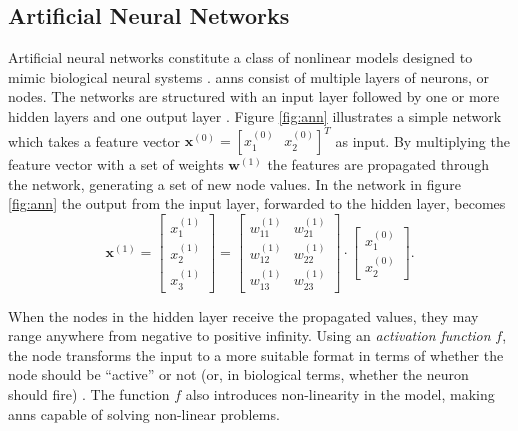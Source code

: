 

\subsection{Artificial Neural Networks}
Artificial neural networks constitute a class of nonlinear models designed to mimic biological neural systems \citep{rojas_1996}. \gls{ann}s consist of multiple layers of neurons, or nodes. The networks are structured with an input layer followed by one or more hidden layers and one output layer \citep{logan_2017}. Figure \ref{fig:ann} illustrates a simple network which takes a feature vector $\mathbf{x}^{(0)}=[x_1^{(0)}\text{ }  x_2^{(0)}]^{T}$ as input. By multiplying the feature vector with a set of weights $\mathbf{w}^{(1)}$ the features are propagated through the network, generating a set of new node values. In the network in figure \ref{fig:ann} the output from the input layer, forwarded to the hidden layer, becomes
\begin{equation}\label{eq:nn}
	\mathbf{x}^{(1)}=\begin{bmatrix}x_1^{(1)} \\ x_2^{(1)} \\ x_3^{(1)} \end{bmatrix} = 
	\begin{bmatrix} w_{11}^{(1)} & w_{21}^{(1)} \\ w_{12}^{(1)} & w_{22}^{(1)} \\ w_{13}^{(1)} & w_{23}^{(1)}\end{bmatrix}\cdot \begin{bmatrix}x_1^{(0)} \\ x_2^{(0)}\end{bmatrix}.
\end{equation}

When the nodes in the hidden layer receive the propagated values, they may range anywhere from negative to positive infinity. Using an \textit{activation function} $f$, the node transforms the input to a more suitable format in terms of whether the node should be ``active'' or not (or, in biological terms, whether the neuron should fire) \citep{kriesel_2007}. The function $f$ also introduces non-linearity in the model, making \gls{ann}s capable of solving non-linear problems. 

